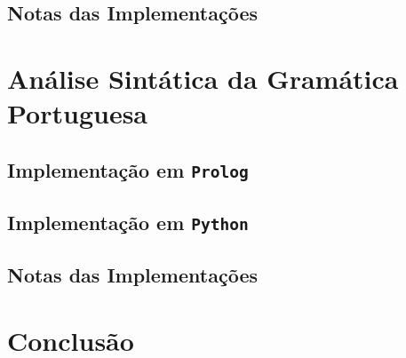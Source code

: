 \documentclass[12pt,a4paper,oneside]{article}
\begin{document}
\lipsum[1]

\lipsum[2]

\lipsum[3]

\subsection{Notas das Implementações}

\lipsum[1]

\lipsum[2]


\section{Análise Sintática da Gramática Portuguesa}
\label{sec:sin}

\lipsum[1]

\subsection{Implementação em \texttt{Prolog}}

\lipsum[1]

\lipsum[2]

\lipsum[3]

\subsection{Implementação em \texttt{Python}}

\lipsum[1]

\lipsum[2]

\lipsum[3]

\subsection{Notas das Implementações}

\lipsum[1]

\lipsum[2]


\section{Conclusão}
\label{sec:conc}

\lipsum[1]

\lipsum[2]



\end{document}

